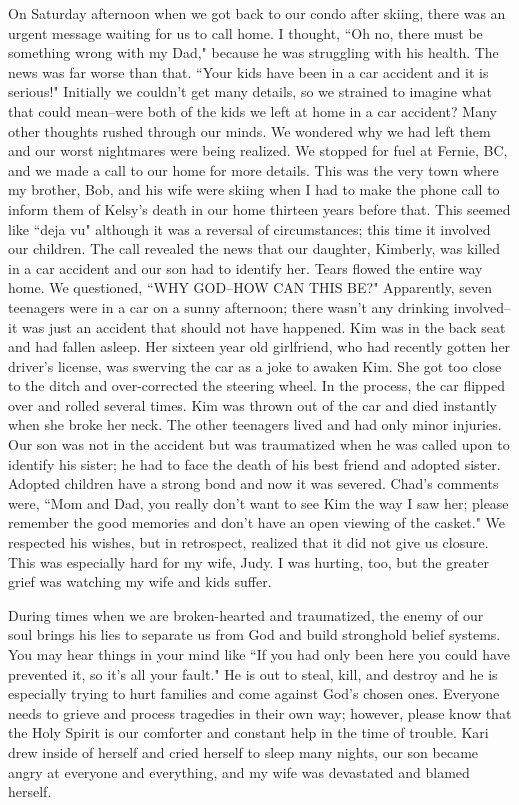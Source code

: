 \documentclass[oneside,12pt]{book}
\begin{document}
On Saturday afternoon when we got back to our condo after skiing, there was an urgent message waiting for us to call home. I thought, ``Oh no, there must be something wrong with my Dad," because he was struggling with his health. The news was far worse than that. ``Your kids have been in a car accident and it is serious!" Initially we couldn't get many details, so we strained to imagine what that could mean--were both of the kids we left at home in a car accident? Many other thoughts rushed through our minds. We wondered why we had left them and our worst nightmares were being realized. We stopped for fuel at Fernie, BC, and we made a call to our home for more details. This was the very town where my brother, Bob, and his wife were skiing when I had to make the phone call to inform them of Kelsy's death in our home thirteen years before that. This seemed like ``deja vu" although it was a reversal of circumstances; this time it involved our children. The call revealed the news that our daughter, Kimberly, was killed in a car accident and our son had to identify her. Tears flowed the entire way home. We questioned, ``WHY GOD--HOW CAN THIS BE?" Apparently, seven teenagers were in a car on a sunny afternoon; there wasn't any drinking involved--it was just an accident that should not have happened. Kim was in the back seat and had fallen asleep. Her sixteen year old girlfriend, who had recently gotten her driver's license, was swerving the car as a joke to awaken Kim. She got too close to the ditch and over-corrected the steering wheel. In the process, the car flipped over and rolled several times. Kim was thrown out of the car and died instantly when she broke her neck. The other teenagers lived and had only minor injuries. Our son was not in the accident but was traumatized when he was called upon to identify his sister; he had to face the death of his best friend and adopted sister. Adopted children have a strong bond and now it was severed. Chad's comments were, ``Mom and Dad, you really don't want to see Kim the way I saw her; please remember the good memories and don't have an open viewing of the casket." We respected his wishes, but in retrospect, realized that it did not give us closure. This was especially hard for my wife, Judy.  I was hurting, too, but the greater grief was watching my wife and kids suffer.

During times when we are broken-hearted and traumatized, the enemy of our soul brings his lies to separate us from God and build stronghold belief systems. You may hear things in your mind like ``If you had only been here you could have prevented it, so it's all your fault." He is out to steal, kill, and destroy and he is especially trying to hurt families and come against God's chosen ones. Everyone needs to grieve and process tragedies in their own way; however, please know that the Holy Spirit is our comforter and constant help in the time of trouble. Kari drew inside of herself and cried herself to sleep many nights, our son became angry at everyone and everything, and my wife was devastated and blamed herself.
\end{document}
